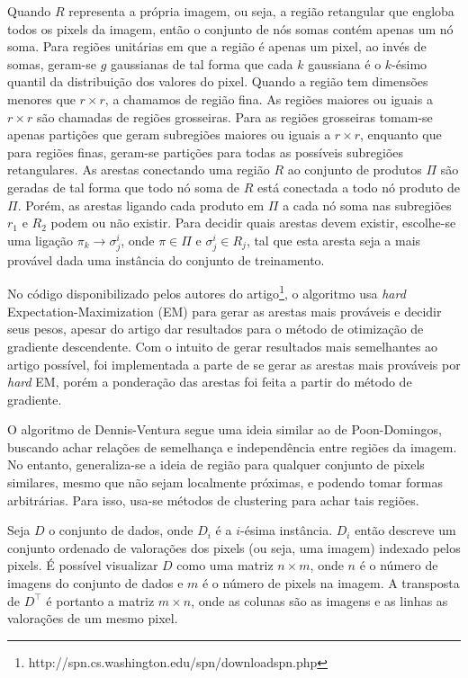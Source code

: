 \documentclass[12pt]{article}
\theoremstyle{plain}
\numberwithin{equation}{section}
\begin{document}
Quando $R$ representa a própria imagem, ou seja, a região retangular que engloba todos os pixels da
imagem, então o conjunto de nós somas contém apenas um nó soma. Para regiões unitárias em que a
região é apenas um pixel, ao invés de somas, geram-se $g$ gaussianas de tal forma que cada $k$
gaussiana é o $k$-ésimo quantil da distribuição dos valores do pixel. Quando a região tem dimensões
menores que $r\times r$, a chamamos de região fina. As regiões maiores ou iguais a $r\times
r$ são chamadas de regiões grosseiras. Para as regiões grosseiras tomam-se apenas partições que
geram subregiões maiores ou iguais a $r\times r$, enquanto que para regiões finas, geram-se
partições para todas as possíveis subregiões retangulares. As arestas conectando uma região $R$ ao
conjunto de produtos $\Pi$ são geradas de tal forma que todo nó soma de $R$ está conectada a todo
nó produto de $\Pi$. Porém, as arestas ligando cada produto em $\Pi$ a cada nó soma nas subregiões
$r_1$ e $R_2$ podem ou não existir. Para decidir quais arestas devem existir, escolhe-se uma
ligação $\pi_k\to\sigma_j^i$, onde $\pi\in\Pi$ e $\sigma_j^i\in R_j$, tal que esta aresta seja a
mais provável dada uma instância do conjunto de treinamento.

No código disponibilizado pelos autores do
artigo\footnote{http://spn.cs.washington.edu/spn/downloadspn.php}, o algoritmo usa \textit{hard}
Expectation-Maximization (EM) para gerar as arestas mais prováveis e decidir seus pesos, apesar do
artigo dar resultados para o método de otimização de gradiente descendente. Com o intuito de gerar
resultados mais semelhantes ao artigo possível, foi implementada a parte de se gerar as arestas
mais prováveis por \textit{hard} EM, porém a ponderação das arestas foi feita a partir do método de
gradiente.

O algoritmo de Dennis-Ventura segue uma ideia similar ao de Poon-Domingos, buscando achar relações
de semelhança e independência entre regiões da imagem. No entanto, generaliza-se a ideia de região
para qualquer conjunto de pixels similares, mesmo que não sejam localmente próximas, e podendo
tomar formas arbitrárias. Para isso, usa-se métodos de clustering para achar tais regiões.

Seja $D$ o conjunto de dados, onde $D_i$ é a $i$-ésima instância. $D_i$ então descreve um conjunto
ordenado de valorações dos pixels (ou seja, uma imagem) indexado pelos pixels. É possível
visualizar $D$ como uma matriz $n\times m$, onde $n$ é o número de imagens do conjunto de dados e
$m$ é o número de pixels na imagem. A transposta de $D^\intercal$ é portanto a matriz $m\times n$,
onde as colunas são as imagens e as linhas as valorações de um mesmo pixel.
\end{document}
